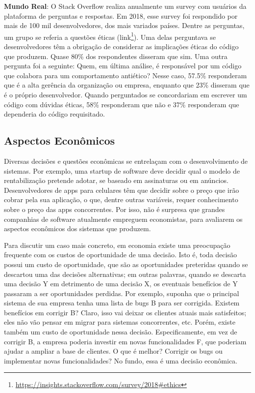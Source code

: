 \documentclass[
  11pt,
  twoside]{book}
\DeclareRobustCommand{\href}[2]{#2\footnote{\url{#1}}}
\newenvironment{esmbox}{\centering \vspace{1.5ex} \begin{tcolorbox}[breakable, colback=backcolor, width=4.9in]}{\end{tcolorbox} \vspace{1.5ex}}
\begin{document}
\begin{esmbox}

\textbf{Mundo Real}: O Stack Overflow realiza anualmente um survey com
usuários da plataforma de perguntas e respostas. Em 2018, esse survey
foi respondido por mais de 100 mil desenvolvedores, dos mais variados
países. Dentre as perguntas, um grupo se referia a questões éticas
(\href{https://insights.stackoverflow.com/survey/2018\#ethics}{link}).
Uma delas perguntava se desenvolvedores têm a obrigação de considerar as
implicações éticas do código que produzem. Quase 80\% dos respondentes
disseram que sim. Uma outra pergunta foi a seguinte: Quem, em última
análise, é responsável por um código que colabora para um comportamento
antiético? Nesse caso, 57.5\% responderam que é a alta gerência da
organização ou empresa, enquanto que 23\% disseram que é o próprio
desenvolvedor. Quando perguntados se concordariam em escrever um código
com dúvidas éticas, 58\% responderam que não e 37\% responderam que
dependeria do código requisitado.

\end{esmbox}

\hypertarget{aspectos-econuxf4micos}{%
\subsection{Aspectos Econômicos}\label{aspectos-econuxf4micos}}

 Diversas decisões e questões econômicas se
entrelaçam com o desenvolvimento de sistemas. Por exemplo, uma startup
de software deve decidir qual o modelo de rentabilização pretende
adotar, se baseado em assinaturas ou em anúncios. Desenvolvedores de
apps para celulares têm que decidir sobre o preço que irão cobrar pela
sua aplicação, o que, dentre outras variáveis, requer conhecimento sobre
o preço das apps concorrentes. Por isso, não é surpresa que grandes
companhias de software atualmente empreguem economistas, para avaliarem
os aspectos econômicos dos sistemas que produzem.

Para discutir um caso mais concreto, em economia existe uma preocupação
frequente com os custos de oportunidade de uma decisão. Isto é, toda
decisão possui um custo de oportunidade, que são as oportunidades
preteridas quando se descartou uma das decisões alternativas; em outras
palavras, quando se descarta uma decisão Y em detrimento de uma decisão
X, os eventuais benefícios de Y passaram a ser oportunidades perdidas.
Por exemplo, suponha que o principal sistema de sua empresa tenha uma
lista de bugs B para ser corrigida. Existem benefícios em corrigir B?
Claro, isso vai deixar os clientes atuais mais satisfeitos; eles não vão
pensar em migrar para sistemas concorrentes, etc. Porém, existe também
um custo de oportunidade nessa decisão. Especificamente, em vez de
corrigir B, a empresa poderia investir em novas funcionalidades F, que
poderiam ajudar a ampliar a base de clientes. O que é melhor? Corrigir
os bugs ou implementar novas funcionalidades? No fundo, essa é uma
decisão econômica.
\end{document}
